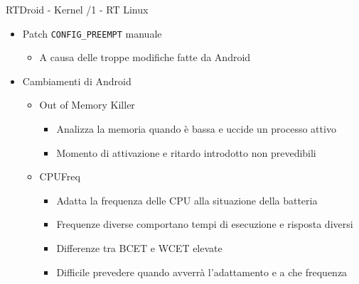 \begin{frame}{RTDroid - Kernel /1}
	- RT Linux
	\begin{itemize}
		\item Patch \texttt{CONFIG\_PREEMPT} manuale
		\begin{itemize}
			\item A causa delle troppe modifiche fatte da Android
		\end{itemize}
		\item Cambiamenti di Android
		\begin{itemize}
			\item Out of Memory Killer
			\begin{itemize}
				\item Analizza la memoria quando è bassa e uccide un processo attivo
				\item Momento di attivazione e ritardo introdotto non prevedibili
			\end{itemize}
			\item CPUFreq
			\begin{itemize}
				\item Adatta la frequenza delle CPU alla situazione della batteria
				\item Frequenze diverse comportano tempi di esecuzione e risposta diversi
				\item Differenze tra BCET e WCET elevate
				\item Difficile prevedere quando avverrà l'adattamento e a che frequenza
			\end{itemize}
		\end{itemize}
	\end{itemize}
\end{frame}
